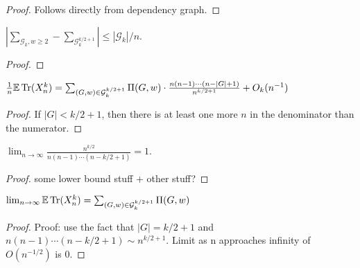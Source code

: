 \begin{proof}
  \notready
  Follows directly from dependency graph.
\end{proof}
\fi



\begin{proposition}
  \label{prop:g_difference_bound}
  \notready
  $|\sum_{\mathcal{G}_{k}, w \ge 2} - \sum_{\mathcal{G}_k^{k/2+1}}| \le |\mathcal{G}_k|/n$.
\end{proposition}

\begin{proof}
  \notready
\end{proof}



\begin{proposition}%
  \label{prop:trace_ev_special_g}
  \notready
  $\frac1n\mathbb{E}\operatorname{Tr}(X_n^k) = \sum_{(G,w)\in\mathcal{G}^{k/2+1}_k} \Pi(G,w) \cdot \frac{n(n-1)\cdots(n-|G|+1)}{n^{k/2+1}} + O_k(n^{-1})$
\end{proposition}

\begin{proof}
  \notready
  If $|G| < k/2 + 1$, then there is at least one more $n$ in the denominator than the numerator.
\end{proof}

\begin{proposition}
  \label{lem:fraction_limit_one}
  \notready
  $\lim_{n\to\infty}\frac{n^{k/2}}{n(n-1)\cdots(n-k/2+1)} = 1$.
\end{proposition}

\begin{proof}
  \notready
  some lower bound stuff + other stuff?
\end{proof}


\begin{proposition}
  \label{prop:trace_ev_limit_equals_sum}
  \notready
  $\lim_{n\to\infty}\mathbb{E}\operatorname{Tr}(X_n^k) = \sum_{(G,w)\in\mathcal{G}^{k/2+1}_k} \Pi(G,w)$
\end{proposition}

\begin{proof}
  \notready
  Proof: use the fact that $|G|=k/2+1$ and $n(n-1)\cdots(n-k/2+1) \sim n^{k/2+1}$. Limit as n approaches infinity of $O(n^{-1/2})$ is 0.
\end{proof}


